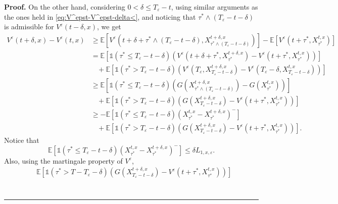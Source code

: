 \documentclass{tufte-handout}
\newcommand{\E}{\mathbb{E}} %
\newenvironment{pf}[1][Proof]{\textbf{#1.} }{\ \rule{0.5em}{0.5em}}
\begin{document}
\begin{pf}
		On the other hand, considering $0 < \delta \leq T_\varepsilon - t$, using similar arguments as the ones held in \eqref{eq:V^epst-V^epst-delta<}, and noticing that $\tau^*\wedge(T_\varepsilon - t - \delta)$ is admissible for $V^\varepsilon(t - \delta, x)$, we get
		\begin{align}
		V^\varepsilon(t + \delta, x) - V^\varepsilon(t, x) &\geq \E\left[V^\varepsilon\left(t + \delta + \tau^*\wedge(T_\varepsilon - t - \delta), X_{\tau^*\wedge(T_\varepsilon - t - \delta)}^{t + \delta, x}\right)\right] - \E\left[V^\varepsilon\left(t + \tau^*, X_{\tau^*}^{t, x}\right)\right] \nonumber \\
		&= \E\left[\mathbb{1}(\tau^* \leq T_\varepsilon - t - \delta)\left(V^\varepsilon\left(t + \delta + \tau^*, X_{\tau^*}^{t + \delta, x}\right) - V^\varepsilon\left(t + \tau^*, X_{\tau^*}^{t, x}\right)\right)\right] \nonumber \\
		&\ \ \ \ +\E\left[\mathbb{1}(\tau^* > T_\varepsilon - t - \delta)\left(V^\varepsilon\left(T_\varepsilon, X_{T_\varepsilon - t - \delta}^{t + \delta, x}\right) - V^\varepsilon\left(T_\varepsilon - \delta, X_{T_\varepsilon - t - \delta}^{t, x}\right)\right)\right] \nonumber \\
		&\geq \E\left[\mathbb{1}(\tau^*\leq T_\varepsilon - t - \delta)\left(G\left(X_{\tau^*\wedge(T_\varepsilon - t - \delta)}^{t + \delta, x}\right) - G\left(X_{\tau^*}^{t, x}\right)\right)\right] \nonumber \\
		&\ \ \ \ +\E\left[\mathbb{1}(\tau^* > T_\varepsilon - t - \delta)\left(G(X_{T_\varepsilon - t - \delta}^{t + \delta, x}) - V^{\varepsilon}(t + \tau^*, X_{\tau^*}^{t, x})\right)\right] \nonumber \\
		&\geq -\E\left[\mathbb{1}(\tau^*\leq T_\varepsilon - t - \delta)\left(X_{\tau^*}^{t, x} - X_{\tau^*}^{t + \delta, x}\right)^-\right] \nonumber \\
		&\ \ \ \ +\E\left[\mathbb{1}(\tau^* > T_\varepsilon - t - \delta)\left(G(X_{T_\varepsilon - t - \delta}^{t + \delta, x}) - V^{\varepsilon}(t + \tau^*, X_{\tau^*}^{t, x})\right)\right]. \label{eq:V^epst+delta-V^epst>}
		\end{align}
		Notice that
		$$
		\E\left[\mathbb{1}(\tau^*\leq T_\varepsilon - t - \delta)\left(X_{\tau^*}^{t, x} - X_{\tau^*}^{t + \delta, x}\right)^-\right] \leq \delta L_{1, x, \varepsilon}.
		$$
		Also, using the martingale property of $V^{\varepsilon}$,
		\begin{align}
		&\E\left[\mathbb{1}(\tau^* > T - T_\varepsilon - \delta)\left(G(X_{T_\varepsilon - t - \delta}^{t + \delta, x}) - V^{\varepsilon}(t + \tau^*, X_{\tau^*}^{t, x})\right)\right] \nonumber \\

\end{align}
\end{pf}
\end{document}
